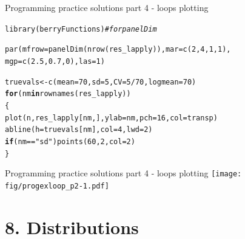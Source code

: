 \documentclass[xcolor=table,           xcolor=dvipsnames]{beamer}\usepackage[]{graphicx}\usepackage[]{color}
\makeatletter
\newcommand{\hlnum}[1]{\textcolor[rgb]{0,0,0}{#1}}
\newcommand{\hlstr}[1]{\textcolor[rgb]{0.545,0.137,0.137}{#1}}
\newcommand{\hlcom}[1]{\textcolor[rgb]{0,0.392,0}{\textit{#1}}}
\newcommand{\hlopt}[1]{\textcolor[rgb]{0,0,0}{#1}}
\newcommand{\hlstd}[1]{\textcolor[rgb]{0,0,0}{#1}}
\newcommand{\hlkwa}[1]{\textcolor[rgb]{1,0,0}{\textbf{#1}}}
\newcommand{\hlkwb}[1]{\textcolor[rgb]{0,0,0}{#1}}
\newcommand{\hlkwc}[1]{\textcolor[rgb]{1,0,1}{#1}}
\newcommand{\hlkwd}[1]{\textcolor[rgb]{0,0,1}{#1}}
\newenvironment{kframe}{%
 \def\at@end@of@kframe{}%
 \ifinner\ifhmode%
  \def\at@end@of@kframe{\end{minipage}}%
  \begin{minipage}{\columnwidth}%
 \fi\fi%
 \def\FrameCommand##1{\hskip\@totalleftmargin \hskip-\fboxsep
 \colorbox{shadecolor}{##1}\hskip-\fboxsep
     \hskip-\linewidth \hskip-\@totalleftmargin \hskip\columnwidth}%
 \MakeFramed {\advance\hsize-\width
   \@totalleftmargin\z@ \linewidth\hsize
   \@setminipage}}%
 {\par\unskip\endMakeFramed%
 \at@end@of@kframe}
\newenvironment{knitrout}{}{} %
\makeatother
\begin{document}
\begin{frame}[fragile]{Programming practice solutions part 4 - loops plotting}
\begin{knitrout}
\color{fgcolor}\begin{kframe}
\begin{alltt}
\hlkwd{library}\hlstd{(berryFunctions)} \hlcom{# for panelDim}

\hlkwd{par}\hlstd{(}\hlkwc{mfrow}\hlstd{=}\hlkwd{panelDim}\hlstd{(}\hlkwd{nrow}\hlstd{(res_lapply)),} \hlkwc{mar}\hlstd{=}\hlkwd{c}\hlstd{(}\hlnum{2}\hlstd{,}\hlnum{4}\hlstd{,}\hlnum{1}\hlstd{,}\hlnum{1}\hlstd{),}
    \hlkwc{mgp}\hlstd{=}\hlkwd{c}\hlstd{(}\hlnum{2.5}\hlstd{,}\hlnum{0.7}\hlstd{,}\hlnum{0}\hlstd{),} \hlkwc{las}\hlstd{=}\hlnum{1} \hlstd{)}

\hlstd{truevals} \hlkwb{<-} \hlkwd{c}\hlstd{(}\hlkwc{mean}\hlstd{=}\hlnum{70}\hlstd{,} \hlkwc{sd}\hlstd{=}\hlnum{5}\hlstd{,} \hlkwc{CV}\hlstd{=}\hlnum{5}\hlopt{/}\hlnum{70}\hlstd{,} \hlkwc{logmean}\hlstd{=}\hlnum{70}\hlstd{)}
\hlkwa{for}\hlstd{(nm} \hlkwa{in} \hlkwd{rownames}\hlstd{(res_lapply))}
  \hlstd{\{}
  \hlkwd{plot}\hlstd{(n, res_lapply[nm, ],} \hlkwc{ylab}\hlstd{=nm,} \hlkwc{pch}\hlstd{=}\hlnum{16}\hlstd{,} \hlkwc{col}\hlstd{=transp)}
  \hlkwd{abline}\hlstd{(}\hlkwc{h}\hlstd{=truevals[nm],} \hlkwc{col}\hlstd{=}\hlnum{4}\hlstd{,} \hlkwc{lwd}\hlstd{=}\hlnum{2}\hlstd{)}
  \hlkwa{if}\hlstd{(nm}\hlopt{==}\hlstr{"sd"}\hlstd{)} \hlkwd{points}\hlstd{(}\hlnum{60}\hlstd{,}\hlnum{2}\hlstd{,} \hlkwc{col}\hlstd{=}\hlnum{2}\hlstd{)}
  \hlstd{\}}
\end{alltt}
\end{kframe}
\end{knitrout}
\end{frame}


\begin{frame}[fragile]{Programming practice solutions part 4 - loops plotting}
\texttt{[image: fig/progexloop\_p2-1.pdf]}
\end{frame}

\section{8. Distributions}
\end{document}
